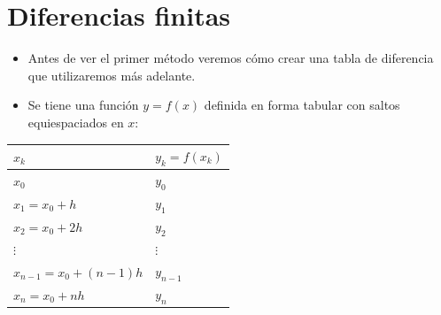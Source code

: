 \documentclass[]{book}
\providecommand{\tightlist}{%
  \setlength{\itemsep}{0pt}\setlength{\parskip}{0pt}}
\begin{document}
\hypertarget{diferencias-finitas}{%
\section{Diferencias finitas}\label{diferencias-finitas}}

\begin{itemize}
\tightlist
\item
  Antes de ver el primer método veremos cómo crear una tabla de diferencia que utilizaremos más adelante.
\item
  Se tiene una función \(y = f(x)\) definida en forma tabular con saltos equiespaciados en \(x\):
\end{itemize}

\begin{longtable}[]{@{}ll@{}}
\toprule
\(x_k\) & \(y_k = f(x_k)\)\tabularnewline
\midrule
\endhead
\(x_0\) & \(y_0\)\tabularnewline
\(x_1 = x_0 + h\) & \(y_1\)\tabularnewline
\(x_2 = x_0 + 2 h\) & \(y_2\)\tabularnewline
\(\vdots\) & \(\vdots\)\tabularnewline
\(x_{n-1} = x_0 + (n-1) h\) & \(y_{n-1}\)\tabularnewline
\(x_{n} = x_0 + n h\) & \(y_n\)\tabularnewline
\bottomrule
\end{longtable}
\end{document}
